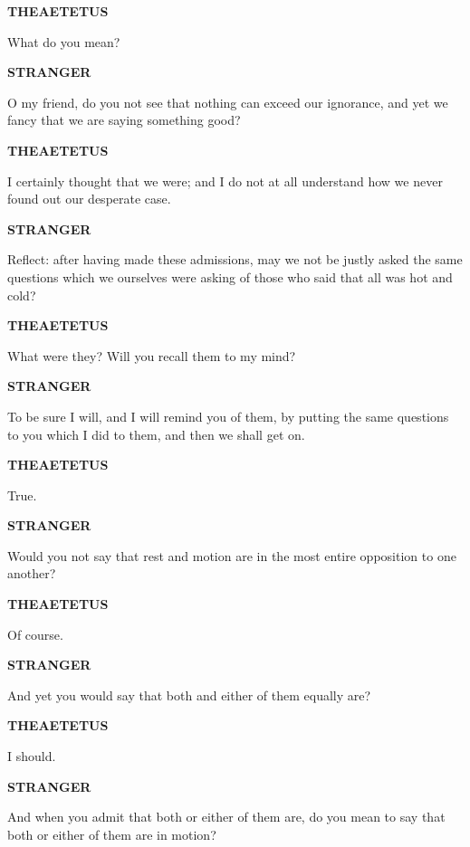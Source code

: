 \documentclass[11pt,letter]{article}
\begin{document}
\par \textbf{THEAETETUS}
\par   What do you mean?

\par \textbf{STRANGER}
\par   O my friend, do you not see that nothing can exceed our ignorance, and yet we fancy that we are saying something good?

\par \textbf{THEAETETUS}
\par   I certainly thought that we were; and I do not at all understand how we never found out our desperate case.

\par \textbf{STRANGER}
\par   Reflect:  after having made these admissions, may we not be justly asked the same questions which we ourselves were asking of those who said that all was hot and cold?

\par \textbf{THEAETETUS}
\par   What were they? Will you recall them to my mind?

\par \textbf{STRANGER}
\par   To be sure I will, and I will remind you of them, by putting the same questions to you which I did to them, and then we shall get on.

\par \textbf{THEAETETUS}
\par   True.

\par \textbf{STRANGER}
\par   Would you not say that rest and motion are in the most entire opposition to one another?

\par \textbf{THEAETETUS}
\par   Of course.

\par \textbf{STRANGER}
\par   And yet you would say that both and either of them equally are?

\par \textbf{THEAETETUS}
\par   I should.

\par \textbf{STRANGER}
\par   And when you admit that both or either of them are, do you mean to say that both or either of them are in motion?
\end{document}

